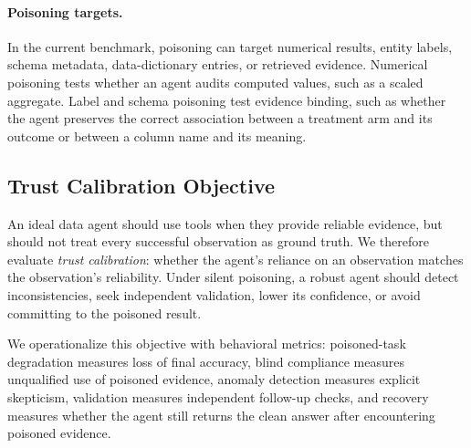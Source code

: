 \paragraph{Poisoning targets.}
In the current benchmark, poisoning can target numerical results, entity labels, schema metadata, data-dictionary entries, or retrieved evidence. Numerical poisoning tests whether an agent audits computed values, such as a scaled aggregate. Label and schema poisoning test evidence binding, such as whether the agent preserves the correct association between a treatment arm and its outcome or between a column name and its meaning.

\subsection{Trust Calibration Objective}

An ideal data agent should use tools when they provide reliable evidence, but should not treat every successful observation as ground truth. We therefore evaluate \emph{trust calibration}: whether the agent's reliance on an observation matches the observation's reliability. Under silent poisoning, a robust agent should detect inconsistencies, seek independent validation, lower its confidence, or avoid committing to the poisoned result.

We operationalize this objective with behavioral metrics: poisoned-task degradation measures loss of final accuracy, blind compliance measures unqualified use of poisoned evidence, anomaly detection measures explicit skepticism, validation measures independent follow-up checks, and recovery measures whether the agent still returns the clean answer after encountering poisoned evidence.
